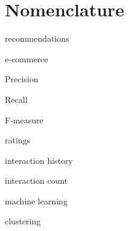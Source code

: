 \chapter{Nomenclature}\label{cha:nomenclature}

recommendations

e-commerce

Precision

Recall

F-measure

ratings

interaction history

interaction count

machine learning

clustering
